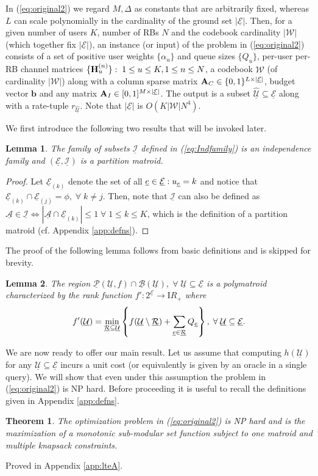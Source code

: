 \documentclass[11pt] {article}
\newcommand{\Reals}     {{{\mathrm I\!R}}}  \newcommand{\Cplx}      {{{\mathsf I}\!\!\!{\mathrm C}}} \newcommand{\NCplx}     {{{\mathcal{CN}}}} \newcommand{\Ints}      {{{\mathbb Z}}} \newcommand{\Rats}      {{{\mathsf I}\!\!\!{\mathrm Q}}}    \newcommand{\Nats}      {{{\mathrm{ I\!N}}}} \newcommand{\Tee}{      {{\mathbb T}}}
\newcommand{\uwti}[1]{{\mathbf #1}}
\newcommand{\bb}{{\uwti b}}  \newcommand{\Bb}{{\uwti B}}
\newcommand{\Wc} {{\mathcal W}}         \newcommand{\Wk} {{\bm {\mathcal W}}}
\newcommand{\Pulk} {{\underline{{\bm {\mathcal P}}}}}
\newcommand{\Bulk} {{\underline{{\bm {\mathcal B}}}}}
\newcommand{\Iulk} {{\underline{{\bm {\mathcal I}}}}}
\newcommand{\Aulc} {{\underline{\mathcal A}}}
\newcommand{\Uulc} {{\underline{\mathcal U}}}
\newcommand{\Eulc} {{\underline{\mathcal E}}}
\newcommand{\Rulc} {{\underline{\mathcal R}}}
\newtheorem{theorem}{Theorem}
\newtheorem{lemma}{Lemma}
\begin{document}
 In (\ref{eq:original2}) we regard $M,\Delta$ as constants that are arbitrarily fixed, whereas $L$ can scale polynomially in the cardinality of the ground set $|\Eulc|$. Then, for a given number of users $K$, number of RBs $N$ and the codebook cardinality $|\Wc|$ (which together fix $|\Eulc|$), an instance
(or input) of the problem in  (\ref{eq:original2}) consists of a set of positive user weights $\{\alpha_u\}$ and queue sizes $\{Q_u\}$,  per-user per-RB channel matrices $\{\Hb_u^{(n)}\}:\;1\leq u\leq K,1\leq n\leq N$, a codebook $\Wc$ (of cardinality $|\Wc|$) along with a column sparse matrix $\Ab_C\in \{0,1\}^{L\times |\Eulc|}$, budget vector $\bb$ and any matrix $\Ab_I\in[0,1]^{M\times |\Eulc|}$.
The output is a subset $\hat{\Uulc}\subseteq \Eulc$ along with a rate-tuple $r_{\hat{\Uulc}}$.
Note that  $|\Eulc|$ is $O(K|\Wc|N^{4})$.

We first introduce the following two results that will be invoked later.
\begin{lemma}\label{lem:Lem1}
The family of subsets $\Iulk$ defined in (\ref{eq:Indfamily}) is an independence  family and   $(\Eulc,\Iulk)$ is a partition matroid.
\end{lemma}
\begin{proof} Let $\Eulc_{(k)}$ denote the set of all $\eul\in\Eulc:u_{\eul}=k$ and notice that $\Eulc_{(k)}\cap\Eulc_{(j)}=\phi,\;\forall\;k\neq j$. Then, note that $\Iulk$ can also be defined as $\Aulc\in\Iulk\Leftrightarrow |\Aulc\cap\Eulc_{(k)}|\leq 1\;\forall\;1\leq k\leq K$, which is the definition of a partition matroid (cf. Appendix \ref{app:defns}).
\end{proof}

The proof  of the  following lemma  follows from basic definitions \cite{edmonds:poly} and is skipped for brevity.
 \begin{lemma}\label{lem:Lem2}
 The region $\Pulk(\Uulc,f)\cap \Bulk(\Uulc),\;\forall\;\Uulc\subseteq\Eulc$ is a polymatroid characterized by the rank function $f':2^{\Eulc}\to\Reals_+$ where
 \begin{eqnarray}\label{eq:deffp}
  f'(\Uulc)=\min_{\Rulc\subseteq\Uulc}\left\{f(\Uulc\setminus\Rulc)+\sum_{\eul\in\Rulc}Q_{\eul}\right\},\;\forall\;\Uulc\subseteq\Eulc.
 \end{eqnarray}
 \end{lemma}
We are now ready to offer our main result. Let us assume that computing $h(\Uulc)$ for any $\Uulc\subseteq\Eulc$ incurs a unit cost (or equivalently is given by an oracle in a single query). We will show that even under this assumption the problem in (\ref{eq:original2}) is NP hard. Before proceeding it is useful to recall the definitions given in Appendix \ref{app:defns}.
 \begin{theorem}\label{thm:lteA}
 The optimization problem in (\ref{eq:original2}) is NP hard and is the maximization of a monotonic sub-modular set function subject to one matroid and multiple knapsack constraints.
  \end{theorem}
\proof Proved in Appendix \ref{app:lteA}. \endproof
\end{document}
